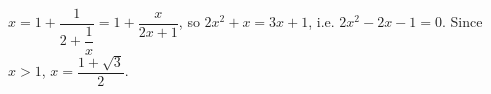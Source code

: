 $x=1+\dfrac1{2+\dfrac1x}=1+\dfrac x{2x+1}$, so $2x^2+x=3x+1$, i.e. $2x^2-2x-1=0$. Since $x>1$, $x=\boxed{\dfrac{1+\sqrt3}2}$.
